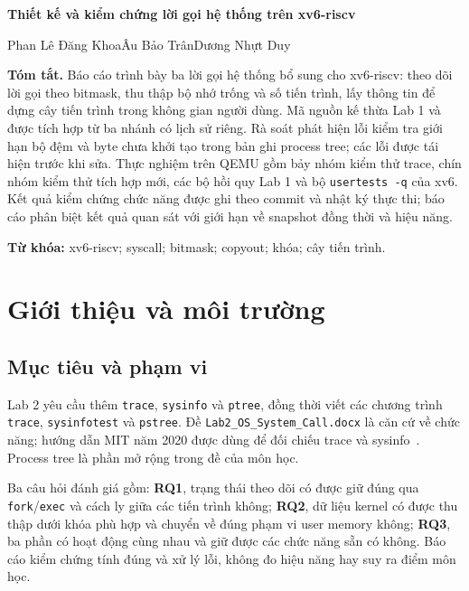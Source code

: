 \documentclass[12pt,a4paper]{article}
\newcommand{\code}[1]{\texttt{#1}}
\begin{document}
\begin{center}
{\large\bfseries Thiết kế và kiểm chứng lời gọi hệ thống trên xv6-riscv}\par
\vspace{4pt}
{\small Phan Lê Đăng Khoa\quad Âu Bảo Trân\quad Dương Nhựt Duy}
\end{center}
\begingroup\small
\noindent\textbf{Tóm tắt.} Báo cáo trình bày ba lời gọi hệ thống bổ sung cho xv6-riscv: theo dõi lời gọi theo bitmask, thu thập bộ nhớ trống và số tiến trình, lấy thông tin để dựng cây tiến trình trong không gian người dùng. Mã nguồn kế thừa Lab 1 và được tích hợp từ ba nhánh có lịch sử riêng. Rà soát phát hiện lỗi kiểm tra giới hạn bộ đệm và byte chưa khởi tạo trong bản ghi process tree; các lỗi được tái hiện trước khi sửa. Thực nghiệm trên QEMU gồm bảy nhóm kiểm thử trace, chín nhóm kiểm thử tích hợp mới, các bộ hồi quy Lab 1 và bộ \code{usertests -q} của xv6. Kết quả kiểm chứng chức năng được ghi theo commit và nhật ký thực thi; báo cáo phân biệt kết quả quan sát với giới hạn về snapshot đồng thời và hiệu năng.
\par\smallskip
\noindent\textbf{Từ khóa:} xv6-riscv; syscall; bitmask; copyout; khóa; cây tiến trình.
\endgroup

\section{Giới thiệu và môi trường}\label{sec:intro}
\subsection{Mục tiêu và phạm vi}
Lab 2 yêu cầu thêm \code{trace}, \code{sysinfo} và \code{ptree}, đồng thời viết các chương trình \code{trace}, \code{sysinfotest} và \code{pstree}. Đề \code{Lab2\_OS\_System\_Call.docx} là căn cứ về chức năng; hướng dẫn MIT năm 2020 được dùng để đối chiếu trace và sysinfo~\cite{assignment,mit-syscall}. Process tree là phần mở rộng trong đề của môn học.

Ba câu hỏi đánh giá gồm: \textbf{RQ1}, trạng thái theo dõi có được giữ đúng qua \code{fork}/\code{exec} và cách ly giữa các tiến trình không; \textbf{RQ2}, dữ liệu kernel có được thu thập dưới khóa phù hợp và chuyển về đúng phạm vi user memory không; \textbf{RQ3}, ba phần có hoạt động cùng nhau và giữ được các chức năng sẵn có không. Báo cáo kiểm chứng tính đúng và xử lý lỗi, không đo hiệu năng hay suy ra điểm môn học.
\end{document}
